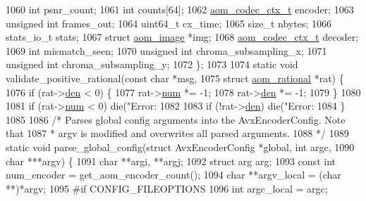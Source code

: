 \begin{DoxyCodeInclude}
{{{{{{{{{1060   \textcolor{keywordtype}{int} psnr\_count;
1061   \textcolor{keywordtype}{int} counts[64];
1062   \hyperlink{structaom__codec__ctx}{aom\_codec\_ctx\_t} encoder;
1063   \textcolor{keywordtype}{unsigned} \textcolor{keywordtype}{int} frames\_out;
1064   uint64\_t cx\_time;
1065   \textcolor{keywordtype}{size\_t} nbytes;
1066   stats\_io\_t stats;
1067   \textcolor{keyword}{struct }\hyperlink{structaom__image}{aom\_image} *img;
1068   \hyperlink{structaom__codec__ctx}{aom\_codec\_ctx\_t} decoder;
1069   \textcolor{keywordtype}{int} mismatch\_seen;
1070   \textcolor{keywordtype}{unsigned} \textcolor{keywordtype}{int} chroma\_subsampling\_x;
1071   \textcolor{keywordtype}{unsigned} \textcolor{keywordtype}{int} chroma\_subsampling\_y;
1072 \};
1073 
1074 \textcolor{keyword}{static} \textcolor{keywordtype}{void} validate\_positive\_rational(\textcolor{keyword}{const} \textcolor{keywordtype}{char} *msg,
1075                                        \textcolor{keyword}{struct} \hyperlink{structaom__rational}{aom\_rational} *rat) \{
1076   \textcolor{keywordflow}{if} (rat->\hyperlink{structaom__rational_adeddf2ea01c12b7be66536e0a0fb92c5}{den} < 0) \{
1077     rat->\hyperlink{structaom__rational_a7b48174411798c780a15f132c4650839}{num} *= -1;
1078     rat->\hyperlink{structaom__rational_adeddf2ea01c12b7be66536e0a0fb92c5}{den} *= -1;
1079   \}
1080 
1081   \textcolor{keywordflow}{if} (rat->\hyperlink{structaom__rational_a7b48174411798c780a15f132c4650839}{num} < 0) die(\textcolor{stringliteral}{"Error: %
1082 
1083   \textcolor{keywordflow}{if} (!rat->\hyperlink{structaom__rational_adeddf2ea01c12b7be66536e0a0fb92c5}{den}) die(\textcolor{stringliteral}{"Error: %
1084 \}
1085 
1086 \textcolor{comment}{/* Parses global config arguments into the AvxEncoderConfig. Note that}
1087 \textcolor{comment}{ * argv is modified and overwrites all parsed arguments.}
1088 \textcolor{comment}{ */}
1089 \textcolor{keyword}{static} \textcolor{keywordtype}{void} parse\_global\_config(\textcolor{keyword}{struct} AvxEncoderConfig *global, \textcolor{keywordtype}{int} argc,
1090                                 \textcolor{keywordtype}{char} ***argv) \{
1091   \textcolor{keywordtype}{char} **argi, **argj;
1092   \textcolor{keyword}{struct }arg arg;
1093   \textcolor{keyword}{const} \textcolor{keywordtype}{int} num\_encoder = get\_aom\_encoder\_count();
1094   \textcolor{keywordtype}{char} **argv\_local = (\textcolor{keywordtype}{char} **)*argv;
1095 \textcolor{preprocessor}{#if CONFIG\_FILEOPTIONS}
1096   \textcolor{keywordtype}{int} argc\_local = argc;
}}}}}}}}}}}
\end{DoxyCodeInclude}
